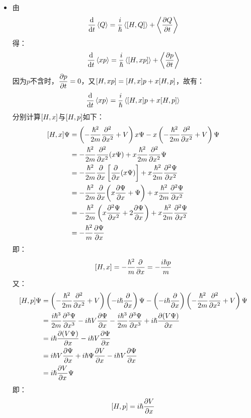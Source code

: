 \documentclass[a4paper,fontset=none]{ctexart}
\renewcommand\hbar\hslash
\begin{document}
\begin{itemize}
        \bigskip
        \item[37.]
        由
        \[
            \dv{t}\expval{Q} = \frac{i}{\hbar} \expval{\comm{H}{Q}} + \expval{\pdv{Q}{t}}
        \]
        得：
        \[
            \dv{t}\expval{xp} = \frac{i}{\hbar} \expval{\comm{H}{xp}} + \expval{\pdv{p}{t}}
        \]
        因为$p$不含时，$\displaystyle \pdv{p}{t} = 0$，又$\comm{H}{xp} = \comm{H}{x}p + x\comm{H}{p}$，故有：
        \[
            \dv{t}\expval{xp} = \frac{i}{\hbar} \expval{\comm{H}{x}p + x\comm{H}{p}}
        \]
        分别计算$\comm{H}{x}$与$\comm{H}{p}$如下：
        \begin{align*}
            \comm{H}{x} \Psi
            &= \left(-\frac{\hbar^2}{2m}\pdv[2]{x} + V\right) x \Psi - x \left(-\frac{\hbar^2}{2m}\pdv[2]{x} + V\right) \Psi \\
            &= -\frac{\hbar^2}{2m} \pdv[2]{x}(x\Psi) + x \frac{\hbar^2}{2m} \pdv[2]{x} \Psi \\
            &= -\frac{\hbar^2}{2m} \pdv{x}\left[\pdv{x}(x\Psi)\right] + x \frac{\hbar^2}{2m} \pdv[2]{\Psi}{x} \\
            &= -\frac{\hbar^2}{2m} \pdv{x}(x\pdv{\Psi}{x} + \Psi) + x \frac{\hbar^2}{2m} \pdv[2]{\Psi}{x} \\
            &= -\frac{\hbar^2}{2m} \left(x\pdv[2]{\Psi}{x} + 2\pdv{\Psi}{x}\right) + x \frac{\hbar^2}{2m} \pdv[2]{\Psi}{x} \\
            &= -\frac{\hbar^2}{m} \pdv{\Psi}{x}
        \end{align*}
        即：
        \[
            \comm{H}{x} = -\frac{\hbar^2}{m} \pdv{x} = -\frac{i\hbar p}{m}
        \]
        又：
        \begin{align*}
            \comm{H}{p} \Psi
            &= \left(-\frac{\hbar^2}{2m}\pdv[2]{x} + V\right) \left(-i\hbar\pdv{x}\right) \Psi - \left(-i\hbar\pdv{x}\right) \left(-\frac{\hbar^2}{2m}\pdv[2]{x} + V\right) \Psi \\
            &= \frac{i\hbar^3}{2m} \pdv[3]{\Psi}{x} - i\hbar V \pdv{\Psi}{x} - \frac{i\hbar^3}{2m} \pdv[3]{\Psi}{x} + i\hbar \pdv{(V\Psi)}{x} \\
            &= i\hbar \pdv{(V\Psi)}{x} - i\hbar V \pdv{\Psi}{x} \\
            &= i\hbar V \pdv{\Psi}{x} + i\hbar \Psi \pdv{V}{x} - i\hbar V \pdv{\Psi}{x} \\
            &= i\hbar \pdv{V}{x} \Psi
        \end{align*}
        即：
        \[
            \comm{H}{p} = i\hbar \pdv{V}{x}
        \]

\end{itemize}
\end{document}
